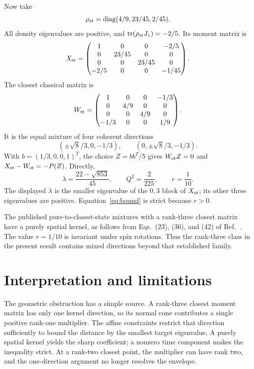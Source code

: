 \documentclass[aps,pra,reprint,amsmath,amssymb,superscriptaddress,longbibliography]{revtex4-2}
\newcommand{\tr}{\operatorname{tr}}
\newcommand{\diag}{\operatorname{diag}}
\begin{document}
Now take
\begin{equation}
 \rho_{\rm st}=\diag(4/9,23/45,2/45).
 \label{eq:rhost}
\end{equation}
All density eigenvalues are positive, and \(\tr(\rho_{\rm st}J_z)=-2/5\). Its moment matrix is
\begin{equation}
 X_{\rm st}=
 \begin{pmatrix}
 1&0&0&-2/5\\
 0&23/45&0&0\\
 0&0&23/45&0\\
 -2/5&0&0&-1/45
 \end{pmatrix}.
\end{equation}
The closest classical matrix is
\begin{equation}
 W_{\rm st}=
 \begin{pmatrix}
 1&0&0&-1/3\\
 0&4/9&0&0\\
 0&0&4/9&0\\
 -1/3&0&0&1/9
 \end{pmatrix}.
 \label{eq:wst}
\end{equation}
It is the equal mixture of four coherent directions
\begin{equation}
 (\pm\sqrt{8}/3,0,-1/3),\qquad
 (0,\pm\sqrt{8}/3,-1/3).
\end{equation}
With \(b=(1/3,0,0,1)^T\), the choice \(Z=bb^T/5\) gives \(W_{\rm st}Z=0\) and \(X_{\rm st}-W_{\rm st}=-P(Z)\). Directly,
\begin{equation}
 \lambda=\frac{22-\sqrt{853}}{45},\qquad
 Q^2=\frac{2}{225},\qquad r=\frac1{10}.
 \label{eq:strictvalues}
\end{equation}
The displayed \(\lambda\) is the smaller eigenvalue of the \(0,3\) block of \(X_{\rm st}\); its other three eigenvalues are positive. Equation~\eqref{eq:bound} is strict because \(r>0\).

The published pure-to-closest-state mixtures with a rank-three closest matrix have a purely spatial kernel, as follows from Eqs.~(23), (36), and (42) of Ref.~\cite{Bohnet2016}. The value \(r=1/10\) is invariant under spin rotations. Thus the rank-three class in the present result contains mixed directions beyond that established family.

\section{Interpretation and limitations}

The geometric obstruction has a simple source. A rank-three closest moment matrix has only one kernel direction, so its normal cone contributes a single positive rank-one multiplier. The affine constraints restrict that direction sufficiently to bound the distance by the smallest target eigenvalue. A purely spatial kernel yields the sharp coefficient; a nonzero time component makes the inequality strict. At a rank-two closest point, the multiplier can have rank two, and the one-direction argument no longer resolves the envelope.
\end{document}
